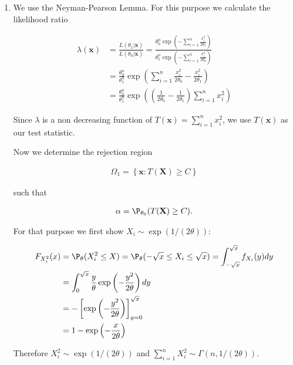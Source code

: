 \begin{solution}

\phantom{}

\begin{enumerate}[label = (\alph*)]
  \item We use the Neyman-Pearson Lemma. For this purpose we calculate the likelihood ratio
  
  \begin{align*}
    \lambda(\textbf{x}) &= \frac{L(\theta_1 | \textbf{x})}{L(\theta_0 | \textbf{x})}
    = \frac{\theta_0^n\exp\left(-\sum_{i=1}^n\frac{x_i^2}{2\theta_1}\right)}{\theta_1^n\exp\left(-\sum_{i=1}^n\frac{x_i^2}{2\theta_0}\right)} \\
    &= \frac{\theta_0^n}{\theta_1^n} \exp\left(\sum_{i=1}^n\frac{x_i^2}{2\theta_0}-\frac{x_i^2}{2\theta_1}\right) \\
    &= \frac{\theta_0^n}{\theta_1^n} \exp\left(\left(\frac{1}{2\theta_0}-\frac{1}{2\theta_1}\right)\sum_{i=1}^n x_i^2\right)
  \end{align*}

  Since $\lambda$ is a non decreasing function of 
    $T(\textbf{x}) = \sum_{i=1}^n x_i^2$,
  we use $T(\textbf{x})$ as our test statistic.

  Now we determine the rejection region

  \begin{align*}
    \Omega_1 = \left\{ \textbf{x}:  T(\textbf{X}) \geq C \right\}
  \end{align*}

  such that

  \begin{align*}
    \alpha = \P_{\theta_0}(T(\textbf{X}) \geq C).
  \end{align*}

  For that purpose we first show $X_i \sim \exp(1/(2\theta))$:

  \begin{align*}
    F_{X_i^2}(x) &= \P_\theta(X_i^2 \leq X)
    = \P_\theta(-\sqrt{x} \leq X_i \leq \sqrt{x})
    = \int_{-\sqrt{x}}^{\sqrt{x}} f_{X_i}(y) dy \\
    &= \int_{0}^{\sqrt{x}} \frac{y}{\theta} \exp\left(-\frac{y^2}{2\theta}\right) dy \\
    &= -\left[\exp\left(-\frac{y^2}{2\theta}\right)\right]_{y = 0}^{\sqrt{x}} \\
    &= 1 - \exp\left(-\frac{x}{2\theta}\right)
  \end{align*}
  
  Therefore $X_i^2 \sim \exp(1/(2\theta))$ and $\sum_{i=1}^n X_i^2 \sim \Gamma(n, 1/(2\theta))$.


\end{enumerate}
\end{solution}
